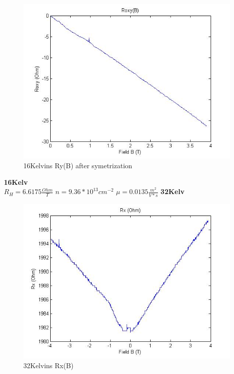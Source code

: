 \documentclass[idxtotoc,hyperref,openany,oneside]{labbook} %
\begin{document}
\begin{figure}[H] %
\begin{center}
\includegraphics[width=1\linewidth]{74616kRoxy.jpg}
\end{center}
\caption{16Kelvins Ry(B)  after symetrization} 
\label{fig:fig17}
\end{figure}
\normalsize \textbf{16Kelv}\\
$R_H=6.6175 \frac{Ohm}{T}$
\newline
$n=9.36*10^{13} cm^{-2}$
\newline
$\mu=0.0135 \frac{m^2}{V*s}$
\newline
\newline
\newline
\normalsize \textbf{32Kelv}\\
\begin{figure}[H] %
\begin{center}
\includegraphics[width=1\linewidth]{74632kRx(B).jpg}
\end{center}
\caption{32Kelvins Rx(B)}
\label{fig:fig10}
\end{figure}
\end{document}
